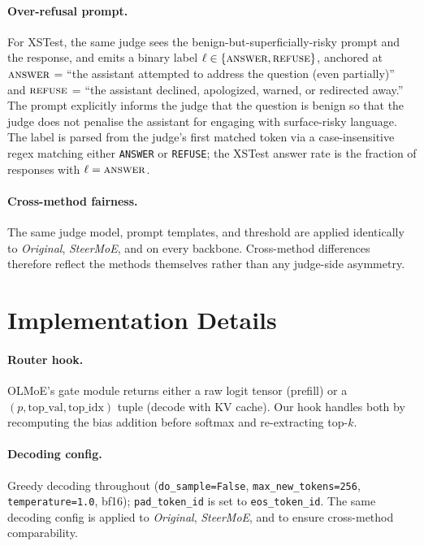 \paragraph{Over-refusal prompt.} For XSTest, the same judge sees the benign-but-superficially-risky prompt and the response, and emits a binary label $\ell \in \{\textsc{answer}, \textsc{refuse}\}$, anchored at $\textsc{answer}$ = ``the assistant attempted to address the question (even partially)'' and $\textsc{refuse}$ = ``the assistant declined, apologized, warned, or redirected away.'' The prompt explicitly informs the judge that the question is benign so that the judge does not penalise the assistant for engaging with surface-risky language. The label is parsed from the judge's first matched token via a case-insensitive regex matching either \texttt{ANSWER} or \texttt{REFUSE}; the XSTest answer rate is the fraction of responses with $\ell = \textsc{answer}$.

\paragraph{Cross-method fairness.} The same judge model, prompt templates, and threshold are applied identically to \emph{Original}, \emph{SteerMoE}, and \name on every backbone. Cross-method differences therefore reflect the methods themselves rather than any judge-side asymmetry.

\section{Implementation Details}
\label{app:impl}

\paragraph{Router hook.} OLMoE's gate module returns either a raw logit
tensor (prefill) or a $(p, \text{top\_val}, \text{top\_idx})$ tuple
(decode with KV cache). Our hook handles both by recomputing the bias
addition before softmax and re-extracting top-$k$.

\paragraph{Decoding config.} Greedy decoding throughout (\texttt{do\_sample=False}, \texttt{max\_new\_tokens=256}, \texttt{temperature=1.0}, bf16); \texttt{pad\_token\_id} is set to \texttt{eos\_token\_id}. The same decoding config is applied to \emph{Original}, \emph{SteerMoE}, and \name to ensure cross-method comparability.

